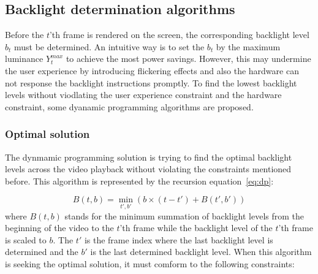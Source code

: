 \subsection{Backlight determination algorithms}
Before the $t$'th frame is rendered on the screen, the corresponding
backlight level $b_t$ must be determined. An intuitive way is to set the
$b_t$ by the maximum luminance $Y_{t}^{max}$ to achieve the most power
savings. However, this may undermine the user experience by
introducing flickering effects and also the hardware can not response
the backlight instructions promptly. To find the lowest backlight
levels without viodlating the user experience constraint and the
hardware constraint, some dyanamic programming algorithms are
proposed. 



\subsubsection{Optimal solution}
The dynmamic programming solution is trying to find the optimal
backlight levels across the video playback without violating the
constraints mentioned before. This algorithm is represented by the
recursion equation~\ref{eq:dp}:

\begin{equation}
  \label{eq:dp}
B(t,b) = \min_{t',b'}(b \times (t - t') + B(t', b')) 
\end{equation}
where $B(t, b)$ stands for the minimum summation of backlight levels
from the beginning of the video to the $t$'th frame while the
backlight level of the $t$'th frame is scaled to $b$. The $t'$ is the
frame index where the last backlight level is determined and the $b'$
is the last determined backlight level. When this algorithm is seeking
the optimal solution, it must comform to the following constraints:


